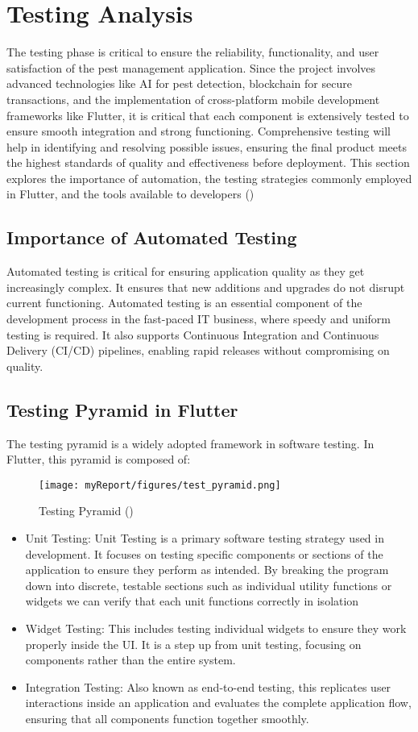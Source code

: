 \section{Testing Analysis}
The testing phase is critical to  ensure the reliability, functionality, and user satisfaction of the pest management application. Since the project involves advanced technologies like AI for pest detection, blockchain for secure transactions, and the implementation of cross-platform mobile development frameworks like Flutter, it is critical that each component is extensively tested to ensure smooth integration and strong functioning. Comprehensive testing will help in identifying and resolving possible issues, ensuring the final product meets the highest standards of quality and effectiveness before deployment. This section explores the importance of automation, the testing strategies commonly employed in Flutter, and the tools available to developers (\cite{testing_analysis})

\subsection{Importance of Automated Testing}
Automated testing is critical for ensuring application quality as they get increasingly complex. It ensures that new additions and upgrades do not disrupt current functioning. Automated testing is an essential component of the development process in the fast-paced IT business, where speedy and uniform testing is required. It also supports Continuous Integration and Continuous Delivery (CI/CD) pipelines, enabling rapid releases without compromising on quality.

\subsection{Testing Pyramid in Flutter}
The testing pyramid is a widely adopted framework in software testing. In Flutter, this pyramid is composed of:
\begin{figure}[ht]
\texttt{[image: myReport/figures/test\_pyramid.png]}
\caption{Testing Pyramid (\cite{testing_analysis})}
\end{figure}

\begin{itemize}
    \item Unit Testing: Unit Testing is a primary software testing strategy used in development. It focuses on testing specific components or sections of the application to ensure they perform as intended. By breaking the program down into discrete, testable sections such as individual utility functions or widgets we can verify that each unit functions correctly in isolation
    \item Widget Testing: This includes testing individual widgets to ensure they work properly inside the UI. It is a step up from unit testing, focusing on components rather than the entire system.
    \item Integration Testing: Also known as end-to-end testing, this replicates user interactions inside an application and evaluates the complete application flow, ensuring that all components function together smoothly. 
\end{itemize}


